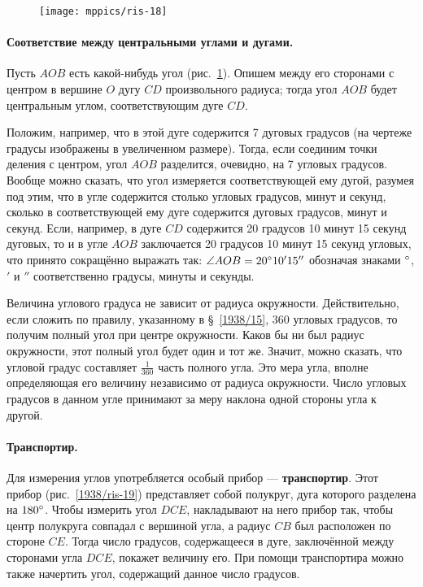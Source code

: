 \documentclass[oneside]{book}
\begin{document}
\begin{figure}
\centering
\texttt{[image: mppics/ris-18]}
\caption{}\label{1938/ris-18}
\end{figure}

\paragraph{Соответствие между центральными углами и дугами.}\label{1938/19}
Пусть $AOB$ есть какой-нибудь угол (рис.~\ref{1938/ris-18}).
Опишем между его сторонами с центром в вершине $O$ дугу $CD$ произвольного радиуса;
тогда угол $AOB$ будет центральным углом, соответствующим дуге $CD$.

Положим, например, что в этой дуге содержится 7 дуговых градусов (на чертеже градусы изображены в увеличенном размере).
Тогда, если соединим точки деления с центром, угол $AOB$ разделится, очевидно, на 7 угловых градусов.
Вообще можно сказать, что угол измеряется соответствующей ему дугой, разумея под этим, что в угле содержится столько угловых градусов, минут и секунд, сколько в соответствующей ему дуге содержится дуговых градусов, минут и секунд.
Если, например, в дуге $CD$ содержится 20 градусов 10 минут 15 секунд дуговых, то и в угле $AOB$ заключается 20 градусов 10 минут 15 секунд угловых, что принято сокращённо выражать так:
$\angle AOB = 20\degree 10'15''$ обозначая знаками $\degree $, $'$ и $''$ соответственно градусы, минуты и секунды.


Величина углового градуса не зависит от радиуса окружности.
Действительно, если сложить по правилу, указанному в §~\ref{1938/15}, 360 угловых градусов, то получим полный угол при центре окружности.
Каков бы ни был радиус окружности, этот полный угол будет один и тот же.
Значит, можно сказать, что угловой градус составляет $\tfrac1{360}$ часть полного угла.
Это мера угла, вполне определяющая его величину независимо от радиуса окружности.
Число угловых градусов в данном угле принимают за меру наклона одной стороны угла к другой.

\paragraph{Транспортир.}\label{1938/20}
Для измерения углов употребляется особый прибор — \textbf{транспортир}.
Этот прибор (рис.~\ref{1938/ris-19}) представляет собой полукруг, дуга которого разделена на $180\degree $.
Чтобы измерить угол $DCE$, накладывают на него прибор так, чтобы центр полукруга совпадал с вершиной угла, а радиус $CB$ был расположен по стороне $CE$.
Тогда число градусов, содержащееся в дуге, заключённой между сторонами угла $DCE$, покажет величину его.
При помощи транспортира можно также начертить угол, содержащий данное число градусов.
\end{document}
